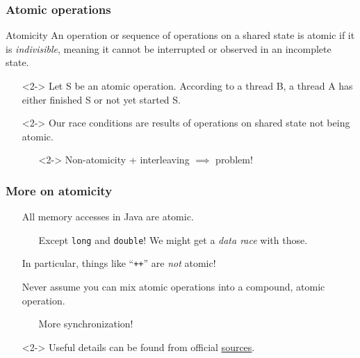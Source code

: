 \documentclass[xcolor={dvipsnames,svgnames},aspectratio=169]{beamer}
\begin{document}
\begin{frame}[fragile]
  \frametitle{Atomic operations}

  \begin{block}{Atomicity}
    An operation or sequence of operations on a shared state is atomic if it is
    \emph{indivisible}, meaning it cannot be interrupted or observed in an
    incomplete state.
  \end{block}

  \begin{itemize}
  \item[\faBook]<2-> Let S be an atomic operation. According to a thread B, a
    thread A has either finished S or not yet started S.
  \item[\faBook]<2-> Our race conditions are results of operations on shared
    state not being atomic.
    \begin{itemize}
    \item[\faUserInjured]<2-> Non-atomicity + interleaving $\implies$ problem!
    \end{itemize}
  \end{itemize}
\end{frame}

\begin{frame}[fragile]
  \frametitle{More on atomicity}

  \begin{itemize}
  \item[\faBook] All memory accesses in Java are atomic.
    \begin{itemize}
    \item[\faUserInjured] Except \texttt{long} and \texttt{double}! We might get
      a \emph{data race} with those.
    \end{itemize}
  \item[\faBook] In particular, things like ``\texttt{++}'' are \emph{not} atomic!
  \item[\faBook] Never assume you can mix atomic operations into a compound,
    atomic operation.
    \begin{itemize}
    \item[\faBriefcaseMedical] More synchronization!
    \end{itemize}
  \end{itemize}

  \begin{itemize}
    \item[\faBook]<2-> Useful details can be found from official \href{https://docs.oracle.com/javase/specs/jls/se10/html/jls-17.htm}{sources}.
    \end{itemize}

\end{frame}
\end{document}
